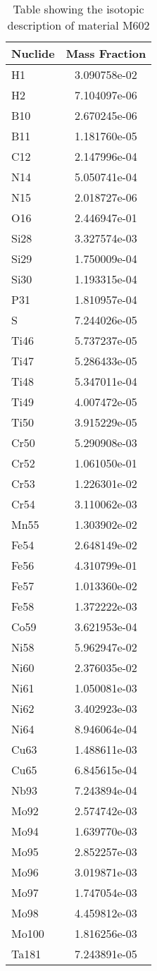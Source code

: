 \begin{centering}
\begin{table}[ht!]
\begin{tabular}{l | c}
\hline
Nuclide & Mass Fraction\\
\hline
H1 & 3.090758e-02\\
H2 & 7.104097e-06\\
B10 & 2.670245e-06\\
B11 & 1.181760e-05\\
C12 & 2.147996e-04\\
N14 & 5.050741e-04\\
N15 & 2.018727e-06\\
O16 & 2.446947e-01\\
Si28 & 3.327574e-03\\
Si29 & 1.750009e-04\\
Si30 & 1.193315e-04\\
P31 & 1.810957e-04\\
S & 7.244026e-05\\
Ti46 & 5.737237e-05\\
Ti47 & 5.286433e-05\\
Ti48 & 5.347011e-04\\
Ti49 & 4.007472e-05\\
Ti50 & 3.915229e-05\\
Cr50 & 5.290908e-03\\
Cr52 & 1.061050e-01\\
Cr53 & 1.226301e-02\\
Cr54 & 3.110062e-03\\
Mn55 & 1.303902e-02\\
Fe54 & 2.648149e-02\\
Fe56 & 4.310799e-01\\
Fe57 & 1.013360e-02\\
Fe58 & 1.372222e-03\\
Co59 & 3.621953e-04\\
Ni58 & 5.962947e-02\\
Ni60 & 2.376035e-02\\
Ni61 & 1.050081e-03\\
Ni62 & 3.402923e-03\\
Ni64 & 8.946064e-04\\
Cu63 & 1.488611e-03\\
Cu65 & 6.845615e-04\\
Nb93 & 7.243894e-04\\
Mo92 & 2.574742e-03\\
Mo94 & 1.639770e-03\\
Mo95 & 2.852257e-03\\
Mo96 & 3.019871e-03\\
Mo97 & 1.747054e-03\\
Mo98 & 4.459812e-03\\
Mo100 & 1.816256e-03\\
Ta181 & 7.243891e-05
\end{tabular}
\caption{Table showing the isotopic description of material M602}
\label{table:material_M602}
\end{table}\clearpage


\end{centering}
